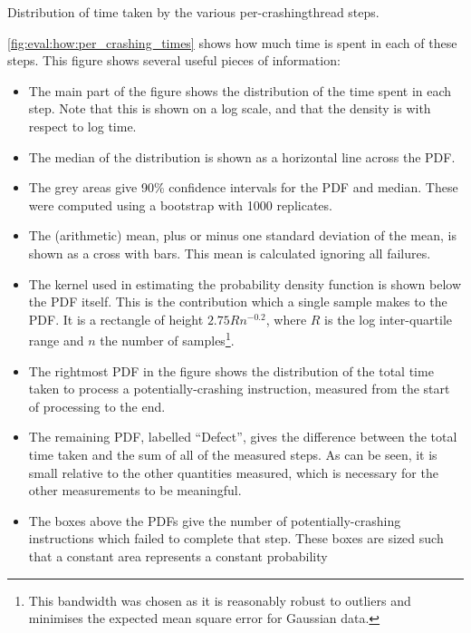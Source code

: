 \begin{sanefig}
  \caption{Distribution of time taken by the various
    per-\gls{crashingthread} steps. \label{fig:eval:how:per_crashing_times}}
\end{sanefig}

\autoref{fig:eval:how:per_crashing_times} shows how much time is spent
in each of these steps.  This figure shows several useful pieces of
information:
\begin{itemize}
\item The main part of the figure shows the distribution of the time
  spent in each step.  Note that this is shown on a log scale, and
  that the density is with respect to log time.
\item The median of the distribution is shown as a horizontal line
  across the PDF.
\item The grey areas give 90\% confidence intervals for the PDF and
  median.  These were computed using a bootstrap with 1000 replicates.
\item The (arithmetic) mean, plus or minus one standard deviation of
  the mean, is shown as a cross with bars.  This mean is calculated
  ignoring all failures.  
\item The kernel used in estimating the probability density function
  is shown below the PDF itself.  This is the contribution which a
  single sample makes to the PDF.  It is a rectangle of height
  $2.75Rn^{-0.2}$, where $R$ is the log inter-quartile range and $n$
  the number of samples\footnote{This bandwidth was chosen as it is
    reasonably robust to outliers and minimises the expected mean
    square error for Gaussian data.}.
\item The rightmost PDF in the figure shows the distribution of the
  total time taken to process a potentially-crashing instruction,
  measured from the start of processing to the end.
\item The remaining PDF, labelled ``Defect'', gives the difference
  between the total time taken and the sum of all of the measured
  steps.  As can be seen, it is small relative to the other quantities
  measured, which is necessary for the other measurements to be
  meaningful.
\item The boxes above the PDFs give the number of potentially-crashing
  instructions which failed to complete that step.  These boxes are
  sized such that a constant area represents a constant probability

\end{itemize}
